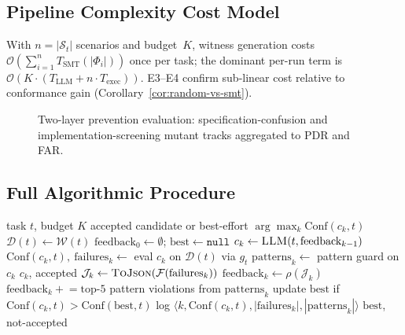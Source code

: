 \subsection{Pipeline Complexity Cost Model}
\label{subsec:complexity-cost}

With $n=|\mathcal{S}_t|$ scenarios and budget~$K$, witness generation costs
$\mathcal{O}(\sum_{i=1}^{n} T_{\text{SMT}}(|\Phi_i|))$ once per task; the
dominant per-run term is
$\mathcal{O}(K \cdot (T_{\text{LLM}} + n \cdot T_{\text{exec}}))$.
E3--E4 confirm sub-linear cost relative to conformance gain
(Corollary~\ref{cor:random-vs-smt}).

\begin{figure}[t]
  \centering
  \caption{Two-layer prevention evaluation: specification-confusion and
    implementation-screening mutant tracks aggregated to PDR and FAR.}
  \label{fig:prevention-protocol}
\end{figure}

\subsection{Full Algorithmic Procedure}
\label{sec:method:algorithm}

\begin{algorithm}[t]
\caption{HSP-Agile (\textsc{SgDP} instantiation)}
\label{alg:sgdp}
\begin{algorithmic}[1]
\Require task $t$, budget $K$
\Ensure accepted candidate or best-effort $\arg\max_k \mathrm{Conf}(c_k,t)$
\State $\mathcal{D}(t) \leftarrow \mathcal{W}(t)$
\State $\text{feedback}_0 \leftarrow \emptyset$; $\text{best} \leftarrow \mathtt{null}$
  \State $c_k \leftarrow \textsc{LLM}(t, \text{feedback}_{k-1})$
  \State $\mathrm{Conf}(c_k,t),\ \text{failures}_k \leftarrow$ eval $c_k$ on $\mathcal{D}(t)$ via $g_t$
  \State $\text{patterns}_k \leftarrow$ pattern guard on $c_k$
   \Return $c_k$, accepted \EndIf
  \State $\mathcal{J}_k \leftarrow \textsc{ToJson}(\mathcal{F}(\text{failures}_k))$
  \State $\text{feedback}_k \leftarrow \rho(\mathcal{J}_k)$
  \State $\text{feedback}_k \mathrel{+}= \text{top-}5$ pattern violations from $\text{patterns}_k$
  \State update $\text{best}$ if $\mathrm{Conf}(c_k,t) > \mathrm{Conf}(\text{best},t)$
  \State log $\langle k, \mathrm{Conf}(c_k,t), |\text{failures}_k|, |\text{patterns}_k|\rangle$
\EndFor
\Return $\text{best}$, not-accepted
\end{algorithmic}
\end{algorithm}

